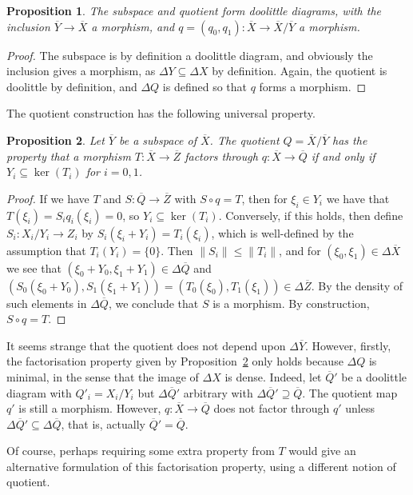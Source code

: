\documentclass[a4paper,11pt]{article}
\theoremstyle{plain}
\newtheorem{proposition}{Proposition}[section]
\theoremstyle{remark}
\newenvironment{remark}
  {\pushQED{\qed}\renewcommand{\qedsymbol}{$\triangle$}\remarkx}
  {\popQED\endremarkx}
\begin{document}
\begin{proposition}
The subspace and quotient form doolittle diagrams, with the inclusion $\overline Y\to\overline X$ a morphism, and $q=(q_0,q_1) \colon \overline X \to \overline X/\overline Y$ a morphism.
\end{proposition}
\begin{proof}
The subspace is by definition a doolittle diagram, and obviously the inclusion gives a morphism, as $\Delta Y \subseteq \Delta X$ by definition.  Again, the quotient is doolittle by definition, and $\Delta Q$ is defined so that $q$ forms a morphism.
\end{proof}

The quotient construction has the following universal property.

\begin{proposition}\label{prop:factor_through_quotient}
Let $\overline Y$ be a subspace of $\overline X$.  The quotient $Q = \overline X / \overline Y$ has the property that a morphism $T\colon \overline X \to \overline Z$ factors through $q\colon \overline X \to \overline Q$ if and only if $Y_i \subseteq \ker(T_i)$ for $i=0,1$.
\end{proposition}
\begin{proof}
If we have $T$ and $S\colon\overline Q\to\overline Z$ with $S\circ q = T$, then for $\xi_i\in Y_i$ we have that $T(\xi_i) = S_i q_i(\xi_i) = 0$, so $Y_i \subseteq \ker(T_i)$.  Conversely, if this holds, then define $S_i \colon X_i / Y_i \to Z_i$ by $S_i(\xi_i + Y_i) = T_i(\xi_i)$, which is well-defined by the assumption that $T_i(Y_i) = \{0\}$.  Then $\|S_i\| \leq \|T_i\|$, and for $(\xi_0,\xi_1) \in \Delta\overline X$ we see that $(\xi_0+Y_0, \xi_1+Y_1) \in \Delta\overline Q$ and $(S_0(\xi_0+Y_0), S_1(\xi_1+Y_1)) = (T_0(\xi_0), T_1(\xi_1)) \in \Delta\overline Z$.  By the density of such elements in $\Delta\overline Q$, we conclude that $S$ is a morphism.  By construction, $S\circ q = T$.
\end{proof}

\begin{remark}
It seems strange that the quotient does not depend upon $\Delta\overline Y$.  However, firstly, the factorisation property given by Proposition~\ref{prop:factor_through_quotient} only holds because $\Delta Q$ is minimal, in the sense that the image of $\Delta X$ is dense.  Indeed, let $\overline Q'$ be a doolittle diagram with $Q'_i = X_i / Y_i$ but $\Delta\overline Q'$ arbitrary with $\Delta \overline Q' \supseteq \overline Q$.  The quotient map $q'$ is still a morphism.  However, $q \colon \overline X \to \overline Q$ does not factor through $q'$ unless $\Delta\overline Q' \subseteq \Delta\overline Q$, that is, actually $\overline Q' = \overline Q$.

Of course, perhaps requiring some extra property from $T$ would give an alternative formulation of this factorisation property, using a different notion of quotient.
\end{remark}
\end{document}

